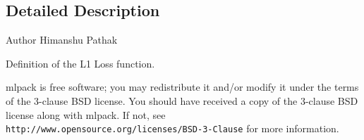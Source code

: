 \subsection{Detailed Description}
\begin{DoxyAuthor}{Author}
Himanshu Pathak
\end{DoxyAuthor}
Definition of the L1 Loss function.

mlpack is free software; you may redistribute it and/or modify it under the terms of the 3-\/clause B\+SD license. You should have received a copy of the 3-\/clause B\+SD license along with mlpack. If not, see {\tt http\+://www.\+opensource.\+org/licenses/\+B\+S\+D-\/3-\/\+Clause} for more information. 